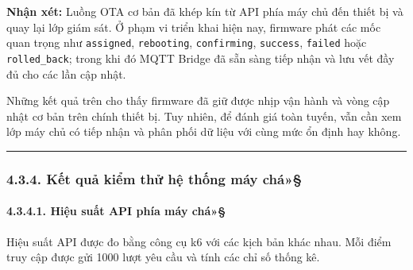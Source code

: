 \documentclass[a4paper]{extarticle}
\begin{document}
\textbf{Nhận xét:} Luồng OTA cơ bản đã khép kín từ API phía máy chủ đến thiết bị
và quay lại lớp giám sát. Ở phạm vi triển khai hiện nay, firmware phát
các mốc quan trọng như \texttt{assigned}, \texttt{rebooting},
\texttt{confirming}, \texttt{success}, \texttt{failed} hoặc
\texttt{rolled\_back}; trong khi đó MQTT Bridge đã sẵn sàng tiếp nhận và
lưu vết đầy đủ cho các lần cập nhật.

Những kết quả trên cho thấy firmware đã giữ được nhịp vận hành và vòng
cập nhật cơ bản trên chính thiết bị. Tuy nhiên, để đánh giá toàn tuyến,
vẫn cần xem lớp máy chủ có tiếp nhận và phân phối dữ liệu với cùng mức
ổn định hay không.

\begin{center}\rule{0.5\linewidth}{0.5pt}\end{center}

\subsubsection{4.3.4. Kết quả kiểm thử hệ thống máy
chá»§}\label{434-kux1ebft-quux1ea3-kiux1ec3m-thux1eed-hux1ec7-thux1ed1ng-cloud}

\paragraph{4.3.4.1. Hiệu suất API phía máy
chá»§}\label{4341-hiux1ec7u-suux1ea5t-api-backend}

Hiệu suất API được đo bằng công cụ k6 với các kịch bản khác nhau. Mỗi
điểm truy cập được gửi 1000 lượt yêu cầu và tính các chỉ số thống kê.
\end{document}
